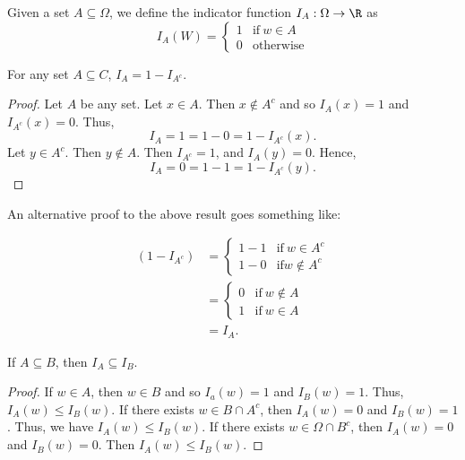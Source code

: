 \begin{definition}
    Given a set \( A \subseteq \Omega \), we define the indicator function \( {I}_{A}: \Omega \to \R  \) as 
    \[ {I}_{A}(W) = 
    \begin{cases}
        1 &\text{if} \ w \in A \\
        0 &\text{otherwise} 
    \end{cases}  \]
\end{definition}

\begin{eg}
   For any set \( A \subseteq C   \), \( {I}_{A}= 1 - {I}_{A^{c}}  \). 
\end{eg}
    \begin{proof}
   Let \( A  \) be any set. Let \( x \in A  \). Then \( x \notin A^{c} \) and so \( {I}_{A}(x) = 1  \) and \( {I}_{A^{c}}(x) = 0  \). Thus, 
   \[  {I}_{A} = 1 = 1 - 0 = 1 - {I}_{A^{c}}(x).  \]
   Let \( y \in A^{c} \). Then \( y \notin A  \). Then \( {I}_{A^{c}} = 1  \), and \( {I}_{A}(y ) = 0  \). Hence, 
   \[  {I}_{A} = 0 = 1 - 1 = 1 - {I}_{A^{c}}(y). \]
   \end{proof}
An alternative proof to the above result goes something like:

\begin{align*}
    (1 - {I}_{A^{c}}) &= 
    \begin{cases}
        1 - 1 &\text{if} \ w \in A^{c} \\
        1 - 0 &\text{if} w \notin A^{c}
    \end{cases} \\
                      &= 
                      \begin{cases}
                          0 &\text{if} \ w \notin A  \\
                          1 &\text{if} \ w \in A
                      \end{cases} \\
                     &= {I}_{A}.
\end{align*}

\begin{eg}
   If \( A \subseteq  B  \), then \( {I}_{A} \subseteq {I}_{B} \). 
\end{eg}
   \begin{proof}
   If \( w \in A  \), then \( w \in B  \) and so \( {I}_{a}(w) = 1  \) and \( {I}_{B}(w) = 1  \). Thus, \( {I}_{A}(w) \leq {I}_{B}(w) \). If there exists \( w \in B \cap A^{c} \), then \( {I}_{A}(w) = 0   \) and \( {I}_{B}(w) = 1  \). Thus, we have \( {I}_{A}(w) \leq {I}_{B}(w)  \). If there exists \( w \in \Omega \cap B^{c} \), then \( {I}_{A}(w) = 0  \) and \( {I}_{B}(w) = 0  \). Then \( {I}_{A}(w) \leq {I}_{B}(w) \).
   \end{proof}


